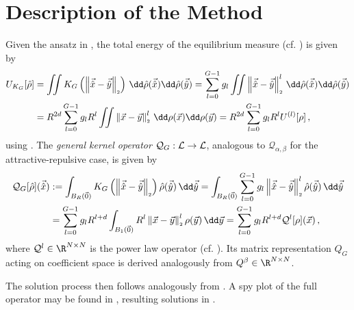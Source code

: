\section{Description of the Method}
Given the ansatz in , the total energy of the equilibrium measure (cf. ) is given by
\begin{align*}
  U_{K_G}[\hat{\rho}] & = \iint K_G\left(\norm{\hatvec{x}-\hatvec{y}}\right) \,\dd\hat{\rho}(\hatvec{x})\dd\hat{\rho}(\hatvec{y})
  = \sum_{l=0}^{G-1} g_l \iint \norm{\hatvec{x}-\hatvec{y}}^l \,\dd\hat{\rho}(\hatvec{x})\dd\hat{\rho}(\hatvec{y})                \\
                      & = R^{2d} \sum_{l=0}^{G-1} g_l R^l \iint \norm{\vec{x}-\vec{y}}^l \,\dd\rho(\vec{x})\dd\rho(\vec{y})
  = R^{2d} \sum_{l=0}^{G-1} g_l R^l U^{(l)}[\rho]\,,
\end{align*}
using .
The \textit{general kernel operator} $\mathcal{Q}_G: \mathcal{L} \to \mathcal{L}$, analogous to $\mathcal{Q}_{\alpha,\beta}$ for the attractive-repulsive case, is given by
\begin{align*}
  \mathcal{Q}_G[\hat{\rho}](\hatvec{x}) & := \int_{B_R(\vec{0})} K_{G}\left(\norm{\hatvec{x} - \hatvec{y}}\right) \hat{\rho}(\hatvec{y}) \,\dd\hatvec{y}
  = \int_{B_R(\vec{0})} \sum_{l=0}^{G-1} g_l \norm{\hatvec{x}-\hatvec{y}}^l \hat{\rho}(\hatvec{y}) \,\dd\hatvec{y}                                       \\
                                        & = \sum_{l=0}^{G-1} g_l R^{l+d} \int_{B_1(\vec{0})} R^l\norm{\vec{x} - \vec{y}}^l \rho(\vec{y}) \,\dd\vec{y}
  = \sum_{l=0}^{G-1} g_l R^{l+d} \mathcal{Q}^l[\rho](\vec{x})\,,
\end{align*}
where $\mathcal{Q}^l \in \R^{N \times N}$ is the power law operator (cf. ).
Its matrix representation $Q_G$ acting on coefficient space is derived analogously from $Q^\beta \in \R^{N \times N}$.

The solution process then follows analogously from .
A spy plot of the full operator may be found in , resulting solutions in .

